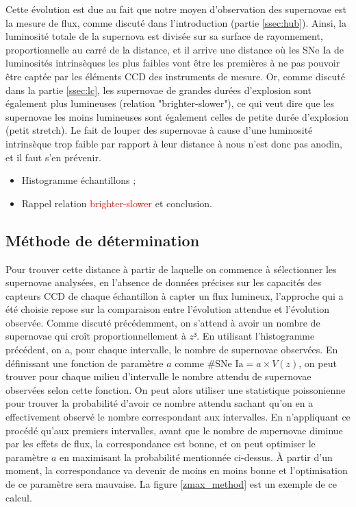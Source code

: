 \documentclass[a4paper, 12pt, svgnames]{article}
\begin{document}
Cette évolution est due au fait que notre moyen d'observation des supernovae est
la mesure de flux, comme discuté dans l'introduction (partie \ref{ssec:hub}).
Ainsi, la luminosité totale de la supernova est divisée sur sa surface de
rayonnement, proportionnelle au carré de la distance, et il arrive une distance
où les SNe Ia de luminosités intrinsèques les plus faibles vont être les
premières à ne pas pouvoir être captée par les éléments CCD des instruments de
mesure. Or, comme discuté dans la partie \ref{ssec:lc}, les supernovae de
grandes durées d'explosion sont également plus lumineuses (relation
"brighter-slower"), ce qui veut dire que les supernovae les moins lumineuses
sont également celles de petite durée d'explosion (petit stretch). Le fait de
louper des supernovae à cause d'une luminosité intrinsèque trop faible par
rapport à leur distance à nous n'est donc pas anodin, et il faut s'en prévenir.

\begin{itemize}
    \item Histogramme échantillons ;
    \item Rappel relation \textcolor{red}{brighter-slower} et conclusion.
\end{itemize}

\subsection{Méthode de détermination}\label{ssec:det}
Pour trouver cette distance à partir de laquelle on commence à sélectionner les
supernovae analysées, en l'absence de données précises sur les capacités des
capteurs CCD de chaque échantillon à capter un flux lumineux, l'approche qui a
été choisie repose sur la comparaison entre l'évolution attendue et l'évolution
observée. Comme discuté précédemment, on s'attend à avoir un nombre de
supernovae qui croît proportionnellement à $z³$. En utilisant l'histogramme
précédent, on a, pour chaque intervalle, le nombre de supernovae observées. En
définissant une fonction de paramètre $a$ comme $\#\text{SNe Ia} = a\times
V(z)$, on peut trouver pour chaque milieu d'intervalle le nombre attendu de
supernovae observées selon cette fonction. On peut alors utiliser une
statistique poissonienne pour trouver la probabilité d'avoir ce nombre attendu
sachant qu'on en a effectivement observé le nombre correspondant aux
intervalles. En n'appliquant ce procédé qu'aux premiers intervalles, avant que
le nombre de supernovae diminue par les effets de flux, la correspondance est
bonne, et on peut optimiser le paramètre $a$ en maximisant la probabilité
mentionnée ci-dessus. À partir d'un moment, la correspondance va devenir de
moins en moins bonne et l'optimisation de ce paramètre sera mauvaise. La figure
\ref{zmax_method} est un exemple de ce calcul.
\end{document}
